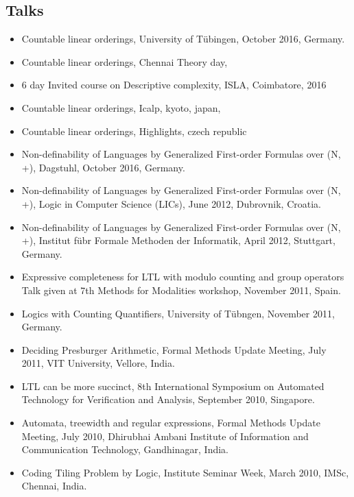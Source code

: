 \documentclass[margin]{res}
\begin{document}
\begin{resume}
\section{Talks}
\begin{itemize}
\item Countable linear orderings, University of T\"ubingen, October 2016, Germany. 
\item Countable linear orderings, Chennai Theory day, 
\item 6 day Invited course on Descriptive complexity, ISLA, Coimbatore, 2016
\item Countable linear orderings, Icalp, kyoto, japan,
\item Countable linear orderings, Highlights, czech republic
\item Non-definability of Languages by Generalized First-order Formulas over (N, +), Dagstuhl, October 2016, Germany. 
\item Non-definability of Languages by Generalized First-order Formulas over (N, +), Logic in Computer Science (LICs), June 2012, Dubrovnik, Croatia. 
\item Non-definability of Languages by Generalized First-order Formulas over (N, +), Institut f\"ubr Formale Methoden der Informatik,  April 2012, Stuttgart, Germany. 
\item Expressive completeness for LTL with modulo counting and group operators Talk given at 7th Methods for Modalities workshop, November 2011, Spain. 
\item Logics with Counting Quantifiers,  University of T\"ubngen, November 2011, Germany. 
\item Deciding Presburger Arithmetic, Formal Methods Update Meeting, July 2011, VIT University, Vellore, India. 
\item LTL can be more succinct, 8th International Symposium on Automated Technology for Verification and Analysis, September 2010, Singapore. 
\item Automata, treewidth and regular expressions, Formal Methods Update Meeting, July 2010, Dhirubhai Ambani Institute of Information and Communication Technology, Gandhinagar, India. 
\item Coding Tiling Problem by Logic, Institute Seminar Week, March 2010, IMSc, Chennai, India. 
\end{itemize}


\end{resume}
\end{document}
